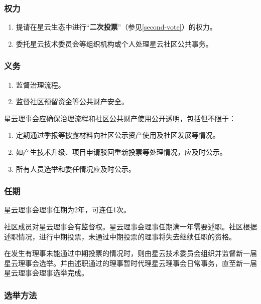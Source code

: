 \subsubsection{权力}

\begin{enumerate}
	\item 提请在星云生态中进行“\textbf{二次投票}”（参见\ref{second-vote}）的权力。
	\item 委托星云技术委员会等组织机构或个人处理星云社区公共事务。
\end{enumerate}

\subsubsection{义务}

\begin{enumerate}
	\item 监督治理流程。
	\item 监督社区预留资金等公共财产安全。
\end{enumerate}

星云理事会应确保治理流程和社区公共财产使用公开透明，包括但不限于：

\begin{enumerate}
	\item 定期通过季报等披露材料向社区公示资产使用及社区发展等情况。
	\item 如产生技术升级、项目申请驳回重新投票等处理情况，应及时公示。
	\item 所有人员选举和委任情况应及时公示。
\end{enumerate}

\subsubsection{任期}

星云理事会理事任期为2年，可连任1次。

\vspace{2em}

社区成员对星云理事会有监督权。星云理事会理事任期满一年需要述职。社区根据述职情况，进行中期投票，未通过中期投票的理事将失去继续任职的资格。

在发生有理事未能通过中期投票的情况时，则由星云技术委员会组织并监督新一届星云理事会选举。并由述职通过的理事暂时代理星云理事会日常事务，直至新一届星云理事会理事选举完成。

\subsubsection{选举方法}

